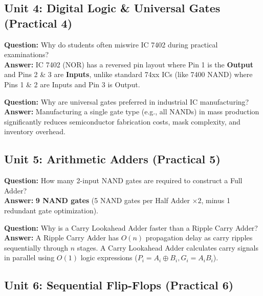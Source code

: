 \subsection{Unit 4: Digital Logic \& Universal Gates (Practical 4)}

\begin{vivaqa}
\textbf{Question:} Why do students often miswire IC 7402 during practical examinations?\\[4pt]
\textbf{Answer:} IC 7402 (NOR) has a reversed pin layout where Pin 1 is the \textbf{Output} and Pins 2 \& 3 are \textbf{Inputs}, unlike standard 74xx ICs (like 7400 NAND) where Pins 1 \& 2 are Inputs and Pin 3 is Output.
\end{vivaqa}

\begin{vivaqa}
\textbf{Question:} Why are universal gates preferred in industrial IC manufacturing?\\[4pt]
\textbf{Answer:} Manufacturing a single gate type (e.g., all NANDs) in mass production significantly reduces semiconductor fabrication costs, mask complexity, and inventory overhead.
\end{vivaqa}

\subsection{Unit 5: Arithmetic Adders (Practical 5)}

\begin{vivaqa}
\textbf{Question:} How many 2-input NAND gates are required to construct a Full Adder?\\[4pt]
\textbf{Answer:} \textbf{9 NAND gates} (5 NAND gates per Half Adder $\times 2$, minus 1 redundant gate optimization).
\end{vivaqa}

\begin{vivaqa}
\textbf{Question:} Why is a Carry Lookahead Adder faster than a Ripple Carry Adder?\\[4pt]
\textbf{Answer:} A Ripple Carry Adder has $O(n)$ propagation delay as carry ripples sequentially through $n$ stages. A Carry Lookahead Adder calculates carry signals in parallel using $O(1)$ logic expressions ($P_i = A_i \oplus B_i, G_i = A_i B_i$).
\end{vivaqa}

\subsection{Unit 6: Sequential Flip-Flops (Practical 6)}

